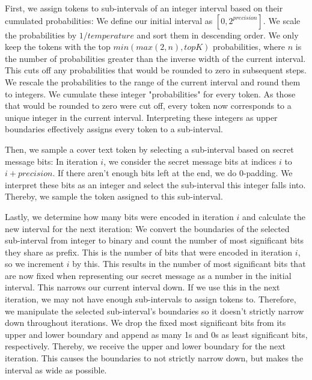 First, we assign tokens to sub-intervals of an integer interval based on their cumulated probabilities: We define our initial interval as $ [0, 2^{precision}] $. We scale the probabilities by $ 1/temperature $ and sort them in descending order. We only keep the tokens with the top $ min(max(2, n), topK) $ probabilities, where $ n $ is the number of probabilities greater than the inverse width of the current interval. This cuts off any probabilities that would be rounded to zero in subsequent steps. We rescale the probabilities to the range of the current interval and round them to integers. We cumulate these integer "probabilities" for every token. As those that would be rounded to zero were cut off, every token now corresponds to a unique integer in the current interval. Interpreting these integers as upper boundaries effectively assigns every token to a sub-interval.

Then, we sample a cover text token by selecting a sub-interval based on secret message bits: In iteration $ i $, we consider the secret message bits at indices $ i $ to $ i + precision $. If there aren't enough bits left at the end, we do 0-padding. We interpret these bits as an integer and select the sub-interval this integer falls into. Thereby, we sample the token assigned to this sub-interval.

Lastly, we determine how many bits were encoded in iteration $ i $ and calculate the new interval for the next iteration: We convert the boundaries of the selected sub-interval from integer to binary and count the number of most significant bits they share as prefix. This is the number of bits that were encoded in iteration $ i $, so we increment $ i $ by this. This results in the number of most significant bits that are now fixed when representing our secret message as a number in the initial interval. This narrows our current interval down. If we use this in the next iteration, we may not have enough sub-intervals to assign tokens to. Therefore, we manipulate the selected sub-interval's boundaries so it doesn't strictly narrow down throughout iterations. We drop the fixed most significant bits from its upper and lower boundary and append as many 1s and 0s as least significant bits, respectively. Thereby, we receive the upper and lower boundary for the next iteration. This causes the boundaries to not strictly narrow down, but makes the interval as wide as possible.

